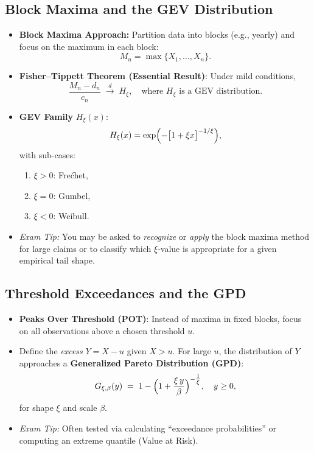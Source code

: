 \documentclass[13pt,a4paper]{article}
\begin{document}
\subsection{Block Maxima and the GEV Distribution}
\begin{itemize}
  \item \textbf{Block Maxima Approach:} Partition data into blocks (e.g., yearly) and focus on the maximum in each block: 
  \[
    M_n = \max\{X_1,\ldots,X_n\}.
  \]
  \item \textbf{Fisher--Tippett Theorem (Essential Result)}: Under mild conditions,
  \[
    \frac{M_n - d_n}{c_n} \;\xrightarrow{d}\; H_{\xi}, 
    \quad \text{where } H_{\xi} \text{ is a GEV distribution.}
  \]
  \item \textbf{GEV Family} \(H_{\xi}(x)\):
    \[
      H_{\xi}(x) 
      = \exp\Bigl(-\bigl[1 + \xi x\bigl]^{-1/\xi}\Bigr),
    \]
    with sub-cases:
    \begin{enumerate}
      \item \(\xi > 0\): Fre\'chet,
      \item \(\xi = 0\): Gumbel,
      \item \(\xi < 0\): Weibull.
    \end{enumerate}
  \item \emph{Exam Tip:} You may be asked to \emph{recognize} or \emph{apply} the block maxima method for large claims or to classify which \(\xi\)-value is appropriate for a given empirical tail shape.
\end{itemize}

\subsection{Threshold Exceedances and the GPD}
\begin{itemize}
  \item \textbf{Peaks Over Threshold (POT)}: Instead of maxima in fixed blocks, focus on all observations above a chosen threshold \(u\). 
  \item Define the \emph{excess} \(Y = X-u\) given \(X>u\). For large \(u\), the distribution of \(Y\) approaches a \textbf{Generalized Pareto Distribution (GPD)}:
    \[
      G_{\xi,\beta}(y) 
      \;=\; 1 - \Bigl(1 + \frac{\xi\,y}{\beta}\Bigr)^{-\tfrac{1}{\xi}},
      \quad y \ge 0,
    \]
    for shape \(\xi\) and scale \(\beta\).
  \item \emph{Exam Tip:} Often tested via calculating “exceedance probabilities” or computing an extreme quantile (Value at Risk).
\end{itemize}
\end{document}
